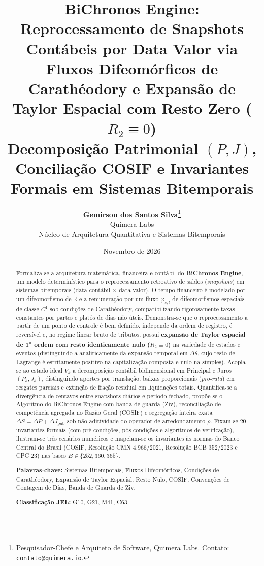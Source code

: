 \documentclass[11pt, a4paper]{article}
\title{\textbf{BiChronos Engine: Reprocessamento de Snapshots Contábeis por Data Valor via Fluxos Difeomórficos de Carathéodory e Expansão de Taylor Espacial com Resto Zero ($R_2 \equiv 0$)}\\[0.3em]\large Decomposição Patrimonial $(P, J)$, Conciliação COSIF e Invariantes Formais em Sistemas Bitemporais}
\author{\textbf{Gemirson dos Santos Silva}\thanks{Pesquisador-Chefe e Arquiteto de Software, Quimera Labs. Contato: \texttt{contato@quimera.io}.}\\[0.2em]
\normalsize Quimera Labs\\\small Núcleo de Arquitetura Quantitativa e Sistemas Bitemporais}
\date{Novembro de 2026}
\theoremstyle{definition}
\theoremstyle{plain}
\theoremstyle{remark}
\begin{document}
\maketitle

\begin{abstract}
\noindent Formaliza-se a arquitetura matemática, financeira e contábil do \textbf{BiChronos Engine}, um modelo determinístico para o reprocessamento retroativo de saldos (\emph{snapshots}) em sistemas bitemporais (data contábil $\times$ data valor). O tempo financeiro é modelado por um difeomorfismo de $\mathbb{R}$ e a remuneração por um fluxo $\varphi_{s,t}$ de difeomorfismos espaciais de classe $C^1$ sob condições de Carathéodory, compatibilizando rigorosamente taxas constantes por partes e platôs de dias não úteis. Demonstra-se que o reprocessamento a partir de um ponto de controle é bem definido, independe da ordem de registro, é reversível e, no regime linear bruto de tributos, possui \textbf{expansão de Taylor espacial de 1\textsuperscript{a} ordem com resto identicamente nulo ($R_2 \equiv 0$)} na variedade de estados e eventos (distinguindo-a analiticamente da expansão temporal em $\Delta\theta$, cujo resto de Lagrange é estritamente positivo na capitalização composta e nulo na simples). Acopla-se ao estado ideal $V_k$ a decomposição contábil bidimensional em Principal e Juros $(P_k, J_k)$, distinguindo aportes por translação, baixas proporcionais (\emph{pro-rata}) em resgates parciais e extinção de fração residual em liquidações totais. Quantifica-se a divergência de centavos entre snapshots diários e período fechado, propõe-se o Algoritmo do BiChronos Engine com banda de guarda (Ziv), reconciliação de competência agregada no Razão Geral (COSIF) e segregação inteira exata $\Delta S = \Delta P + \Delta J_{\text{pub}}$ sob não-aditividade do operador de arredondamento $\rho$. Fixam-se 20 invariantes formais (com pré-condições, pós-condições e algoritmos de verificação), ilustram-se três cenários numéricos e mapeiam-se os invariantes às normas do Banco Central do Brasil (COSIF, Resolução CMN 4.966/2021, Resolução BCB 352/2023 e CPC 23) nas bases $B \in \{252, 360, 365\}$.

\vspace{0.8em}
\noindent\textbf{Palavras-chave:} Sistemas Bitemporais, Fluxos Difeomórficos, Condições de Carathéodory, Expansão de Taylor Espacial, Resto Nulo, COSIF, Convenções de Contagem de Dias, Banda de Guarda de Ziv.

\vspace{0.4em}
\noindent\textbf{Classificação JEL:} G10, G21, M41, C63.
\end{abstract}
\end{document}
